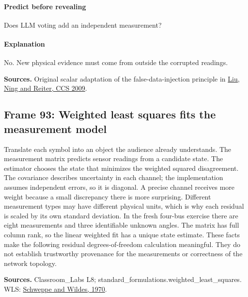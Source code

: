 \documentclass[11pt]{article}
\begin{document}
\paragraph{Predict before revealing}Does LLM voting add an independent measurement?
\paragraph{Explanation}No. New physical evidence must come from outside the corrupted readings.
\par\nopagebreak\begin{minipage}{\linewidth}{\footnotesize\color{slate}\textbf{Sources.} Original scalar adaptation of the false-data-injection principle in \href{https://doi.org/10.1145/1653662.1653666}{Liu, Ning and Reiter, CCS 2009}.\par}\end{minipage}\par\medskip
\subsection*{Frame 93: Weighted least squares fits the measurement model}
Translate each symbol into an object the audience already understands. The measurement matrix predicts sensor readings from a candidate state. The estimator chooses the state that minimizes the weighted squared disagreement. The covariance describes uncertainty in each channel; the implementation assumes independent errors, so it is diagonal. A precise channel receives more weight because a small discrepancy there is more surprising. Different measurement types may have different physical units, which is why each residual is scaled by its own standard deviation. In the fresh four-bus exercise there are eight measurements and three identifiable unknown angles. The matrix has full column rank, so the linear weighted fit has a unique state estimate. These facts make the following residual degrees-of-freedom calculation meaningful. They do not establish trustworthy provenance for the measurements or correctness of the network topology.\par
\par\nopagebreak\begin{minipage}{\linewidth}{\footnotesize\color{slate}\textbf{Sources.} Classroom\_Labs L8; standard\_formulations.weighted\_least\_squares. WLS: \href{https://doi.org/10.1109/TPAS.1970.292678}{Schweppe and Wildes, 1970}.\par}\end{minipage}\par\medskip
\end{document}
